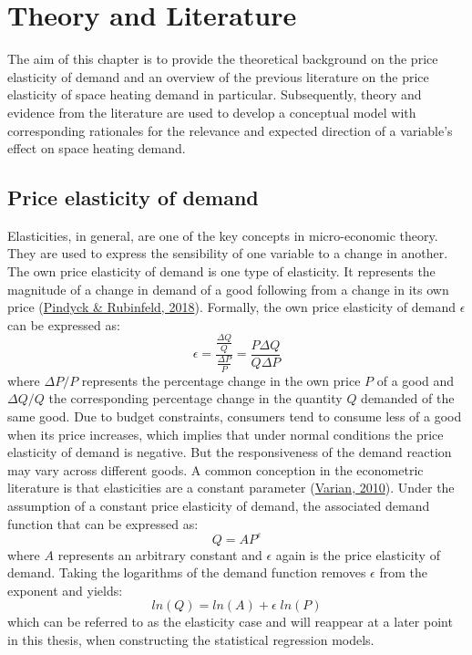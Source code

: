 \documentclass[12pt,twoside]{reedthesis}
\begin{document}
\hypertarget{literature}{%
\chapter{Theory and Literature}\label{literature}}

The aim of this chapter is to provide the theoretical background on the price elasticity of demand and an overview of the previous literature on the price elasticity of space heating demand in particular. Subsequently, theory and evidence from the literature are used to develop a conceptual model with corresponding rationales for the relevance and expected direction of a variable's effect on space heating demand.

\hypertarget{theory}{%
\section{Price elasticity of demand}\label{theory}}

Elasticities, in general, are one of the key concepts in micro-economic theory. They are used to express the sensibility of one variable to a change in another. The own price elasticity of demand is one type of elasticity. It represents the magnitude of a change in demand of a good following from a change in its own price (\protect\hyperlink{ref-pindyck_rubinfeld18}{Pindyck \& Rubinfeld, 2018}). Formally, the own price elasticity of demand \(\epsilon\) can be expressed as:
\begin{equation}
\epsilon = \frac{\frac{\Delta Q}{Q}}{\frac{\Delta P}{P}} = \frac{P \Delta Q}{Q \Delta P}
\label{eq:ep}
\end{equation}
where \(\Delta P/P\) represents the percentage change in the own price \(P\) of a good and \(\Delta Q/Q\) the corresponding percentage change in the quantity \(Q\) demanded of the same good. Due to budget constraints, consumers tend to consume less of a good when its price increases, which implies that under normal conditions the price elasticity of demand is negative. But the responsiveness of the demand reaction may vary across different goods. A common conception in the econometric literature is that elasticities are a constant parameter (\protect\hyperlink{ref-varian10}{Varian, 2010}). Under the assumption of a constant price elasticity of demand, the associated demand function that can be expressed as:
\begin{equation}
Q = AP^{\varepsilon}
\label{eq:demand}
\end{equation}
where \(A\) represents an arbitrary constant and \(\epsilon\) again is the price elasticity of demand. Taking the logarithms of the demand function removes \(\epsilon\) from the exponent and yields:
\begin{equation}
ln(Q) = ln(A) + \epsilon \; ln(P)
\label{eq:demand2}
\end{equation}
which can be referred to as the elasticity case and will reappear at a later point in this thesis, when constructing the statistical regression models.
\end{document}

